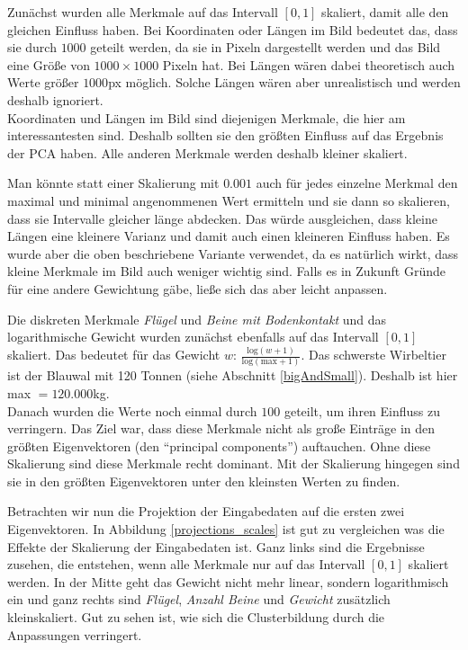  Zunächst wurden alle Merkmale auf das Intervall $[0, 1]$ skaliert, damit alle den gleichen Einfluss haben.
 Bei Koordinaten oder Längen im Bild bedeutet das, dass sie durch $1000$ geteilt werden, da sie in Pixeln dargestellt werden und das Bild eine Größe von $1000 \times 1000$ Pixeln hat. Bei Längen wären dabei theoretisch auch Werte größer $1000$px möglich. Solche Längen wären aber unrealistisch und werden deshalb ignoriert.\\
 Koordinaten und Längen im Bild sind diejenigen Merkmale, die hier am interessantesten sind. Deshalb sollten sie den größten Einfluss auf das Ergebnis der PCA haben. Alle anderen Merkmale werden deshalb kleiner skaliert.
 
 Man könnte statt einer Skalierung mit $0.001$ auch für jedes einzelne Merkmal den maximal und minimal angenommenen Wert ermitteln und sie dann so skalieren, dass sie Intervalle gleicher länge abdecken. Das würde ausgleichen, dass \zb kleine Längen eine kleinere Varianz und damit auch einen kleineren Einfluss haben.
 Es wurde aber die oben beschriebene Variante verwendet, da es natürlich wirkt, dass kleine Merkmale im Bild auch weniger wichtig sind. Falls es in Zukunft Gründe für eine andere Gewichtung gäbe, ließe sich das aber leicht anpassen.
 
 Die diskreten Merkmale \emph{Flügel} und \emph{Beine mit Bodenkontakt} und das logarithmische Gewicht wurden zunächst ebenfalls auf das Intervall $[0, 1]$ skaliert. Das bedeutet für das Gewicht $w$: $\frac{\mathrm{log}(w+1)}{\mathrm{log}(\mathrm{max}+1)}$. Das schwerste Wirbeltier ist der Blauwal mit 120 Tonnen (siehe Abschnitt \ref{bigAndSmall}). Deshalb ist hier max $= 120.000$kg.\\
 Danach wurden die Werte noch einmal durch $100$ geteilt, um ihren Einfluss zu verringern. Das Ziel war, dass diese Merkmale nicht als große Einträge in den größten Eigenvektoren (den "`principal components"') auftauchen. Ohne diese Skalierung sind diese Merkmale recht dominant. Mit der Skalierung hingegen sind sie in den größten Eigenvektoren unter den kleinsten Werten zu finden.
 
 Betrachten wir nun die Projektion der Eingabedaten auf die ersten zwei  Eigenvektoren. In Abbildung \ref{projections_scales} ist gut zu vergleichen was die Effekte der Skalierung der Eingabedaten ist. Ganz links sind die Ergebnisse zusehen, die entstehen, wenn alle Merkmale nur auf das Intervall $[0, 1]$ skaliert werden. In der Mitte geht das Gewicht nicht mehr linear, sondern logarithmisch ein und ganz rechts sind \emph{Flügel}, \emph{Anzahl Beine} und \emph{Gewicht} zusätzlich kleinskaliert. Gut zu sehen ist, wie sich die Clusterbildung durch die Anpassungen verringert.
 
